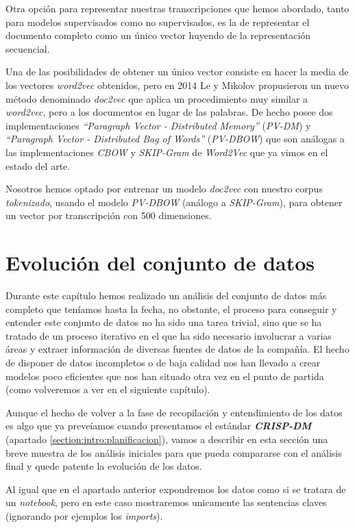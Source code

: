 Otra opción para representar nuestras transcripciones que hemos abordado, tanto para modelos supervisados como no supervisados, es la de representar el documento completo como un único vector huyendo de la representación secuencial.

Una de las posibilidades de obtener un único vector consiste en hacer la media de los vectores \textit{word2vec} obtenidos, pero en 2014 Le y Mikolov \cite{doc2vec} propusieron un nuevo método denominado \textit{doc2vec} que aplica un procedimiento muy similar a \textit{word2vec}, pero a los documentos en lugar de las palabras. De hecho posee dos implementaciones \textit{``Paragraph Vector - Distributed Memory''} (\textit{PV-DM}) y \textit{``Paragraph Vector - Distributed Bag of Words''} (\textit{PV-DBOW}) que son análogas a las implementaciones \textit{CBOW} y \textit{SKIP-Gram} de \textit{Word2Vec} que ya vimos en el estado del arte.


Nosotros hemos optado por entrenar un modelo \textit{doc2vec} con nuestro corpus \textit{tokenizado},  usando el modelo \textit{PV-DBOW} (análogo a \textit{SKIP-Gram}), para obtener un vector por transcripción con 500 dimensiones.


\section{Evolución del conjunto de datos}
\label{section:data:evol}

Durante este capítulo hemos realizado un análisis del conjunto de datos más completo que teníamos hasta la fecha, no obstante, el proceso para conseguir y entender este conjunto de datos no ha sido una tarea trivial, sino que se ha tratado de un proceso iterativo en el que ha sido necesario involucrar a varias áreas y extraer información de diversas fuentes de datos de la compañía. El hecho de disponer de datos incompletos o de baja calidad nos han llevado a crear modelos poco eficientes que nos han situado otra vez en el punto de partida (como volveremos a ver en el siguiente capítulo). 

Aunque el hecho de volver a la fase de recopilación y entendimiento de los datos es algo que ya preveíamos cuando presentamos el estándar \textbf{\textit{CRISP-DM}} (apartado \ref{section:intro:planificacion}),  vamos a describir en esta sección una breve muestra de los análisis iniciales para que pueda compararse con el análisis final y quede patente la evolución de los datos.

Al igual que en el apartado anterior expondremos los datos como si se tratara de un \textit{notebook}, pero en este caso mostraremos unicamente las sentencias claves (ignorando por ejemplos los \textit{imports}). 

